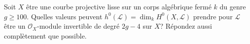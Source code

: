 \begin{exercise}
\label{exercise-sections-degree-2g-minus-4}
Soit $X$ être une courbe projective lisse sur un corps algébrique
fermé $k$ du genre $g \geq 100$.
Quelles valeurs peuvent $h^0(\mathcal{L}) = \dim_k H^0(X, \mathcal{L})$ prendre
pour $\mathcal{L}$ être un $\mathcal{O}_X$-module invertible de degré $2g - 4$ sur
$X$? Répondez aussi complètement que possible.
\end{exercise}
















